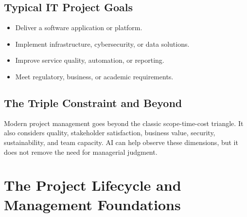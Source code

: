 \documentclass[11pt,a4paper]{article}
\begin{document}
\subsection{Typical IT Project Goals}

\begin{itemize}[leftmargin=*]
  \item Deliver a software application or platform.
  \item Implement infrastructure, cybersecurity, or data solutions.
  \item Improve service quality, automation, or reporting.
  \item Meet regulatory, business, or academic requirements.
\end{itemize}

\subsection{The Triple Constraint and Beyond}

\begin{center}
\end{center}

\begin{conceptbox}
Modern project management goes beyond the classic scope-time-cost triangle. It also considers quality, stakeholder satisfaction, business value, security, sustainability, and team capacity. AI can help observe these dimensions, but it does not remove the need for managerial judgment.
\end{conceptbox}

\section{The Project Lifecycle and Management Foundations}
\end{document}
